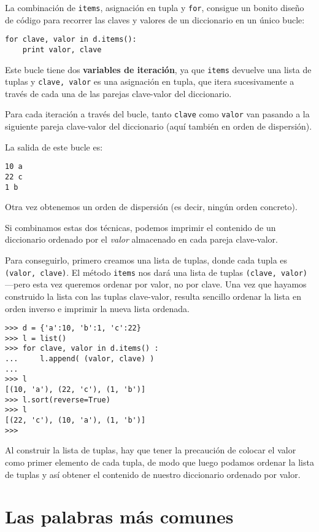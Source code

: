 La combinación de {\tt items}, asignación en tupla y {\tt for},
consigue un bonito diseño de código para recorrer las claves y valores
de un diccionario en un único bucle:

\beforeverb
\begin{verbatim}
for clave, valor in d.items():
    print valor, clave
\end{verbatim}
\afterverb
%
Este bucle tiene dos {\bf variables de iteración}, ya que {\tt items} devuelve
una lista de tuplas y {\tt clave, valor} es una asignación en tupla,
que itera sucesivamente a través de cada una de las parejas clave-valor del
diccionario.

Para cada iteración a través del bucle, tanto {\tt clave} como {\tt valor} van
pasando a la siguiente pareja clave-valor del diccionario
(aquí también en orden de dispersión).

La salida de este bucle es:

\beforeverb
\begin{verbatim}
10 a
22 c
1 b
\end{verbatim}
\afterverb
%
Otra vez obtenemos un orden de dispersión (es decir, ningún orden concreto).

Si combinamos estas dos técnicas, podemos imprimir el contenido
de un diccionario ordenado por el \emph{valor} almacenado en cada pareja
clave-valor.

Para conseguirlo, primero creamos una lista de tuplas, donde cada tupla es
{\tt (valor, clave)}. El método {\tt items} nos dará una lista de
tuplas {\tt (clave, valor)}---pero esta vez queremos ordenar por valor, no
por clave. Una vez que hayamos construido la lista con las tuplas clave-valor,
resulta sencillo ordenar la lista en orden inverso e imprimir la nueva lista ordenada.

\beforeverb
\begin{verbatim}
>>> d = {'a':10, 'b':1, 'c':22}
>>> l = list()
>>> for clave, valor in d.items() :
...     l.append( (valor, clave) )
... 
>>> l
[(10, 'a'), (22, 'c'), (1, 'b')]
>>> l.sort(reverse=True)
>>> l
[(22, 'c'), (10, 'a'), (1, 'b')]
>>> 
\end{verbatim}
\afterverb
%
Al construir la lista de tuplas, hay que tener la precaución de colocar el valor
como primer elemento de cada tupla, de modo que luego podamos ordenar la lista de tuplas
y así obtener el contenido de nuestro diccionario ordenado por valor.

\section{Las palabras más comunes}

